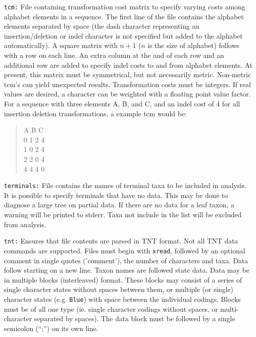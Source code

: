 \documentclass[11pt]{article}
\begin{document}
			\smallskip		
			\noindent \texttt{tcm:} File containing transformation cost matrix to specify varying costs among alphabet elements in a sequence.  The first line of the file 
			contains the alphabet elements separated by space (the dash character representing an insertion/deletion or indel character is not specified but added to the alphabet automatically).
			A square matrix with $n + 1$ ($n$ is the size of alphabet) follows with a row on each line.  An extra column at the and of each row and an additional row are 
			added to specify indel costs to and from alphabet elements.  At present, this matrix must be symmetrical, but not necessarily metric.  Non-metric tcm's can
			yield unexpected results. Transformation costs must be integers.  If real values are desired, a character can be weighted with a floating point value factor. For a sequence with three elements A, B, and C,  and an indel cost of 4 for all insertion deletion transformations, a example tcm would  be:
			\begin{quote}
			A B C\\
			0 1 2 4\\
			1 0 2 4\\
			2 2 0 4\\
		    4 4 4 0\\
	   		 \end{quote}
   		 
   		 	\smallskip		
   		 	\noindent \texttt{terminals:}  File contains the names of terminal taxa to be included in analysis.  It is possible to specify terminals that have no data.  This may be done to diagnose a large tree on partial data.  If there are no data for a leaf taxon, a warning will be printed to stderr.  Taxa not include in the list will be excluded from analysis. 
	   
			\smallskip		
			\noindent \texttt{tnt:} Ensures that file contents are parsed in TNT \citep{Goloboffetal2008} format.
			Not all TNT data commands are supported.  Files must begin with \texttt{xread}, followed by an optional comment in single quotes ('comment'), the number of characters and taxa.  Data follow starting on a new
			line.  Taxon names are followed state data.  Data may be in multiple blocks (interleaved) format.  These
			blocks may consist of a series of single character states  without spaces between them, or multiple (or single) character states (e.g. \texttt{Blue}) with space between the individual codings. Blocks must be of all
			one type (ie. single character codings without spaces, or multi-character separated by spaces).
			The data block must be followed by a single semicolon (``;'') on its own line.
			
\end{document}
